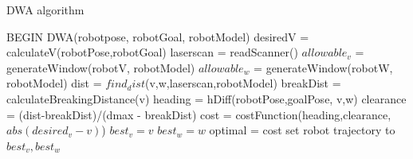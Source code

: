 \begin{algorithm}
\caption{DWA algorithm}
\begin{algorithmic}
\STATE BEGIN DWA(robotpose, robotGoal, robotModel)
\STATE desiredV = calculateV(robotPose,robotGoal)
\STATE   laserscan = readScanner()
\STATE   $allowable_v$ = generateWindow(robotV, robotModel)
\STATE   $allowable_w$  = generateWindow(robotW, robotModel)
      \STATE dist = $find_dist$(v,w,laserscan,robotModel)
      \STATE breakDist = calculateBreakingDistance(v)
         \STATE heading = hDiff(robotPose,goalPose, v,w)
         \STATE clearance = (dist-breakDist)/(dmax - breakDist)
         \STATE cost = costFunction(heading,clearance, $abs(desired_v - v)$)
            \STATE $best_v = v$
            \STATE $best_w = w$
            \STATE optimal = cost
        \ENDIF
      \ENDIF
      \ENDFOR
\ENDFOR
\STATE  set robot trajectory to $best_v, best_w$
\END
\end{algorithmic}
\end{algorithm}
\newpage
